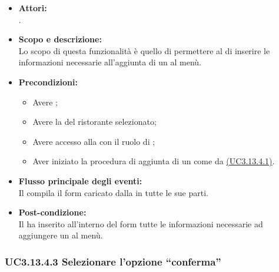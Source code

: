 \begin{itemize}
	\item \textbf{Attori:}
	\\.
	\item \textbf{Scopo e descrizione:} 
	\\Lo scopo di questa funzionalità è quello di permettere al  di inserire le informazioni necessarie all'aggiunta di un  al menù.
	\item \textbf{Precondizioni:}
	\begin{itemize}
		\item Avere ;
		\item Avere la  del ristorante selezionato;
		\item Avere accesso alla  con il ruolo di ;
		\item Aver iniziato la procedura di aggiunta di un  come da \hyperref[UC3.13.4.1]{(UC3.13.4.1)}.
	\end{itemize}
	\item \textbf{Flusso principale degli eventi:}
	\\Il {} compila il form caricato dalla  in tutte le sue parti.
	\item \textbf{Post-condizione:}
	\\Il {} ha inserito all'interno del form tutte le informazioni necessarie ad aggiungere un  al menù.
\end{itemize}

\subsubsection{UC3.13.4.3 Selezionare l'opzione “conferma”} \label{UC3.13.4.3}

